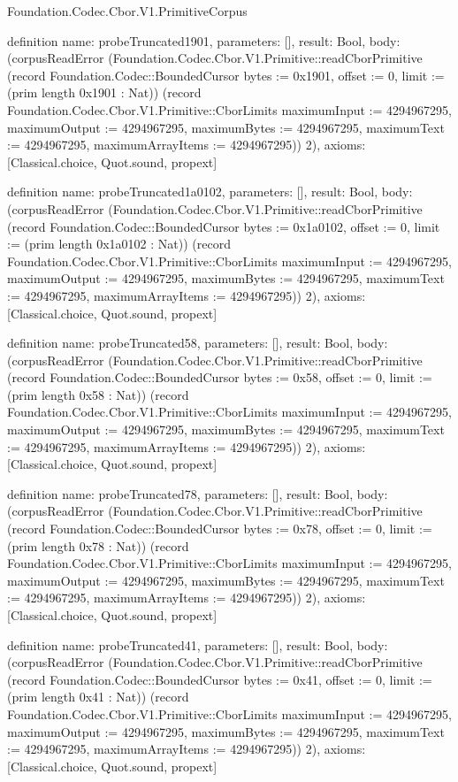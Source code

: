 \begin{lexlean}{Foundation.Codec.Cbor.V1.PrimitiveCorpus}
\begin{semanticmodule}
definition{
  name: probeTruncated1901,
  parameters: [],
  result: Bool,
  body: (corpusReadError (Foundation.Codec.Cbor.V1.Primitive::readCborPrimitive (record Foundation.Codec::BoundedCursor {bytes := 0x1901, offset := 0, limit := (prim length 0x1901 : Nat)}) (record Foundation.Codec.Cbor.V1.Primitive::CborLimits {maximumInput := 4294967295, maximumOutput := 4294967295, maximumBytes := 4294967295, maximumText := 4294967295, maximumArrayItems := 4294967295})) 2),
  axioms: [Classical.choice, Quot.sound, propext]
}

definition{
  name: probeTruncated1a0102,
  parameters: [],
  result: Bool,
  body: (corpusReadError (Foundation.Codec.Cbor.V1.Primitive::readCborPrimitive (record Foundation.Codec::BoundedCursor {bytes := 0x1a0102, offset := 0, limit := (prim length 0x1a0102 : Nat)}) (record Foundation.Codec.Cbor.V1.Primitive::CborLimits {maximumInput := 4294967295, maximumOutput := 4294967295, maximumBytes := 4294967295, maximumText := 4294967295, maximumArrayItems := 4294967295})) 2),
  axioms: [Classical.choice, Quot.sound, propext]
}

definition{
  name: probeTruncated58,
  parameters: [],
  result: Bool,
  body: (corpusReadError (Foundation.Codec.Cbor.V1.Primitive::readCborPrimitive (record Foundation.Codec::BoundedCursor {bytes := 0x58, offset := 0, limit := (prim length 0x58 : Nat)}) (record Foundation.Codec.Cbor.V1.Primitive::CborLimits {maximumInput := 4294967295, maximumOutput := 4294967295, maximumBytes := 4294967295, maximumText := 4294967295, maximumArrayItems := 4294967295})) 2),
  axioms: [Classical.choice, Quot.sound, propext]
}

definition{
  name: probeTruncated78,
  parameters: [],
  result: Bool,
  body: (corpusReadError (Foundation.Codec.Cbor.V1.Primitive::readCborPrimitive (record Foundation.Codec::BoundedCursor {bytes := 0x78, offset := 0, limit := (prim length 0x78 : Nat)}) (record Foundation.Codec.Cbor.V1.Primitive::CborLimits {maximumInput := 4294967295, maximumOutput := 4294967295, maximumBytes := 4294967295, maximumText := 4294967295, maximumArrayItems := 4294967295})) 2),
  axioms: [Classical.choice, Quot.sound, propext]
}

definition{
  name: probeTruncated41,
  parameters: [],
  result: Bool,
  body: (corpusReadError (Foundation.Codec.Cbor.V1.Primitive::readCborPrimitive (record Foundation.Codec::BoundedCursor {bytes := 0x41, offset := 0, limit := (prim length 0x41 : Nat)}) (record Foundation.Codec.Cbor.V1.Primitive::CborLimits {maximumInput := 4294967295, maximumOutput := 4294967295, maximumBytes := 4294967295, maximumText := 4294967295, maximumArrayItems := 4294967295})) 2),
  axioms: [Classical.choice, Quot.sound, propext]
}


\end{semanticmodule}
\end{lexlean}
